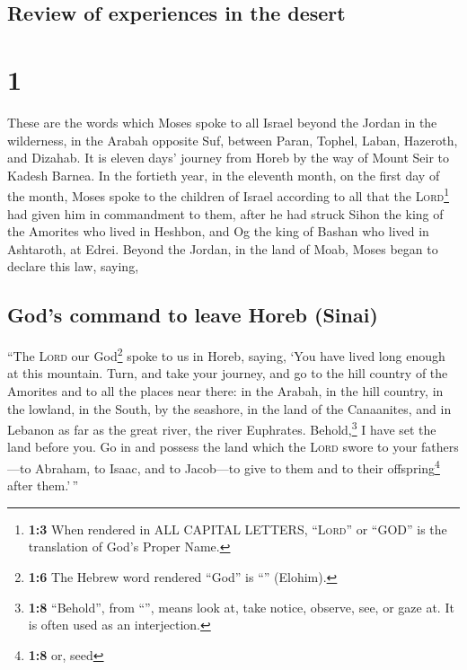 \hypertarget{review-of-experiences-in-the-desert}{%
\subsection{Review of experiences in the
desert}\label{review-of-experiences-in-the-desert}}

\hypertarget{section}{%
\section{1}\label{section}}

 These are the words which Moses spoke to all Israel
beyond the Jordan in the wilderness, in the Arabah opposite Suf, between
Paran, Tophel, Laban, Hazeroth, and Dizahab.  It is eleven
days' journey from Horeb by the way of Mount Seir to Kadesh Barnea.
 In the fortieth year, in the eleventh month, on the first
day of the month, Moses spoke to the children of Israel according to all
that the \textsc{Lord}\footnote{\textbf{1:3} When rendered in ALL
  CAPITAL LETTERS, ``\textsc{Lord}'' or ``GOD'' is the translation of
  God's Proper Name.} had given him in commandment to them,
 after he had struck Sihon the king of the Amorites who
lived in Heshbon, and Og the king of Bashan who lived in Ashtaroth, at
Edrei.  Beyond the Jordan, in the land of Moab, Moses
began to declare this law, saying,

\hypertarget{gods-command-to-leave-horeb-sinai}{%
\subsection{God's command to leave Horeb
(Sinai)}\label{gods-command-to-leave-horeb-sinai}}

 ``The \textsc{Lord} our God\footnote{\textbf{1:6} The
  Hebrew word rendered ``God'' is ``'' (Elohim).} spoke to
us in Horeb, saying, `You have lived long enough at this mountain.
 Turn, and take your journey, and go to the hill country
of the Amorites and to all the places near there: in the Arabah, in the
hill country, in the lowland, in the South, by the seashore, in the land
of the Canaanites, and in Lebanon as far as the great river, the river
Euphrates.  Behold,\footnote{\textbf{1:8} ``Behold'', from
  ``'', means look at, take notice, observe, see, or gaze
  at. It is often used as an interjection.} I have set the land before
you. Go in and possess the land which the \textsc{Lord} swore to your
fathers---to Abraham, to Isaac, and to Jacob---to give to them and to
their offspring\footnote{\textbf{1:8} or, seed} after them.'\,''

